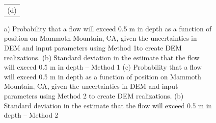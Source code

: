 \documentclass[12pt]{article}
\begin{document}
\begin{figure}[H]
\begin{minipage}{0.6\textwidth}
\begin{tabular}{c}
        (d)
        \end{tabular}
    \end{minipage} 
    \caption{a) Probability that a flow will exceed 0.5 m in depth as
      a function of position on Mammoth Mountain, CA, given the
      uncertainties in DEM and input parameters using Method 1to
      create DEM realizations. (b) Standard deviation in the estimate
      that the flow will exceed 0.5 m in depth -- Method 1 (c)
      Probability that a flow will exceed 0.5 m in depth as a function
      of position on Mammoth Mountain, CA, given the uncertainties in
      DEM and input parameters using Method 2 to create DEM
      realizations.  (b) Standard deviation in the estimate that the
      flow will exceed 0.5 m in depth -- Method 2 }
\label{fig4}  
\end{figure}


\end{document}
